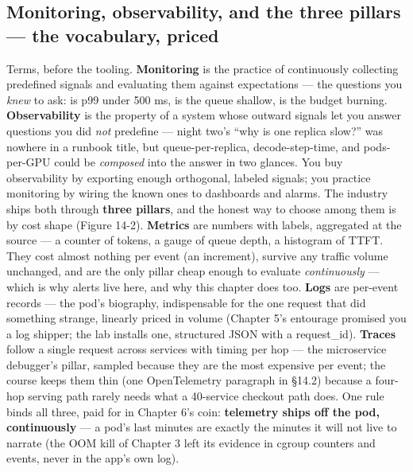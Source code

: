 \subsection*{Monitoring, observability, and the three pillars — the vocabulary, priced}

Terms, before the tooling. \textbf{Monitoring} is the practice of continuously collecting predefined signals and evaluating them against expectations — the questions you \textit{knew} to ask: is p99 under 500 ms, is the queue shallow, is the budget burning. \textbf{Observability} is the property of a system whose outward signals let you answer questions you did \textit{not} predefine — night two’s “why is one replica slow?” was nowhere in a runbook title, but queue-per-replica, decode-step-time, and pods-per-GPU could be \textit{composed} into the answer in two glances. You buy observability by exporting enough orthogonal, labeled signals; you practice monitoring by wiring the known ones to dashboards and alarms. The industry ships both through \textbf{three pillars}, and the honest way to choose among them is by cost shape (Figure 14-2). \textbf{Metrics} are numbers with labels, aggregated at the source — a counter of tokens, a gauge of queue depth, a histogram of TTFT. They cost almost nothing per event (an increment), survive any traffic volume unchanged, and are the only pillar cheap enough to evaluate \textit{continuously} — which is why alerts live here, and why this chapter does too. \textbf{Logs} are per-event records — the pod’s biography, indispensable for the one request that did something strange, linearly priced in volume (Chapter 5’s entourage promised you a log shipper; the lab installs one, structured JSON with a request\_id). \textbf{Traces} follow a single request across services with timing per hop — the microservice debugger’s pillar, sampled because they are the most expensive per event; the course keeps them thin (one OpenTelemetry paragraph in §14.2) because a four-hop serving path rarely needs what a 40-service checkout path does. One rule binds all three, paid for in Chapter 6’s coin: \textbf{telemetry ships off the pod, continuously} — a pod’s last minutes are exactly the minutes it will not live to narrate (the OOM kill of Chapter 3 left its evidence in cgroup counters and events, never in the app’s own log).

